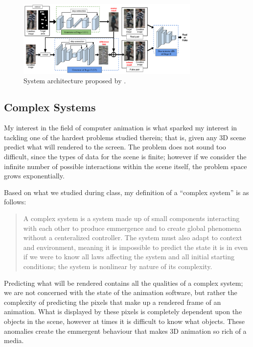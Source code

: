 \documentclass[conference]{IEEEtran}
\begin{document}
\begin{figure}[htbp]
\centerline{\includegraphics[width=9cm]{pose_guided.png}}
\caption{System architecture proposed by \cite{ref:pose_guided}.}
\label{fig:pose_guided}
\end{figure}

\subsection{Complex Systems}
\label{subsec:complex_systems}
My interest in the field of computer animation is what sparked my interest in
tackling one of the hardest problems studied therein; that is, given any 3D scene
predict what will rendered to the screen. The problem does not sound too
difficult, since the types of data for the scene is finite; however if we
consider the infinite number of possible interactions within the scene itself,
the problem space grows exponentially.

Based on what we studied during class, my definition of a ``complex system'' is
as follows:
\blockquote{
A complex system is a system made up of small components interacting with each
other to produce emmergence and to create global phenomena without a centeralized
controller. The system must also adapt to context and environment, meaning it is
impossible to predict the state it is in even if we were to know all laws
affecting the system and all initial starting conditions; the system is
nonlinear by nature of its complexity.
}

Predicting what will be rendered contains all the qualities of a complex system;
we are not concerned with the state of the animation software, but rather the
complexity of predicting the pixels that make up a rendered frame of an
animation. What is displayed by these pixels is completely dependent upon the
objects in the scene, however at times it is difficult to know what objects.
These anomalies create the emmergent behaviour that makes 3D animation so rich
of a media.
\end{document}
